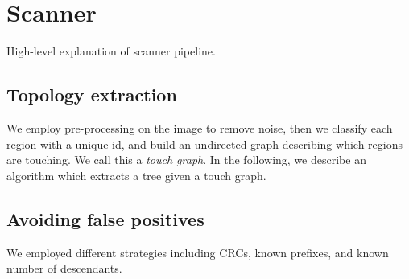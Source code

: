 \section{Scanner}

High-level explanation of scanner pipeline. 

\subsection[topology]{Topology extraction}

We employ pre-processing on the image to remove noise, then we classify each region with a unique id, and build an undirected graph describing which regions are touching. We call this a \textit{touch graph}. In the following, we describe an algorithm which extracts a tree given a touch graph.

\subsection[falsePositives]{Avoiding false positives}

We employed different strategies including CRCs, known prefixes, and known number of descendants.
